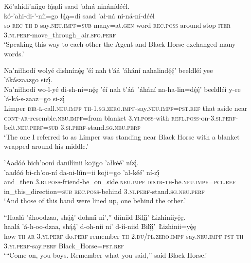 \ea\label{ex:text1-35}
Kó’ahidi’níigo łą́ądi saad ’ałná ninánídéél.\\
\gll kó-’ahi-di-’-níi=go	łą́ą=di	saad	’ał-ná	ni-ná-ní-déél\\
     so-\textsc{rec}-\textsc{th}-\textsc{d}-say.\textsc{neu}.\textsc{impf}=\textsc{sub}	many=at.\textsc{gen}	word	\textsc{rec}.\textsc{poss}-around	stop-\textsc{iter}-3.\textsc{ni}.\textsc{perf}-move\_through\_air.\textsc{sfo}.\textsc{perf}\\
\glt `Speaking this way to each other the Agent and Black Horse exchanged many words.'
\z

\ea\label{ex:text1-36-1}
Na’niłhodí wolyé dishnínę́ę ’éí nah t’áá ’áhání nahalindę́ę́’ beeldléí yee ’ákászaazgo sizį́.\\
\gll Na’niłhodí	wo-l-yé	di-sh-ní=nę́ę	’éí	nah	t’áá~{’áhání}	na-ha-lin=dę́ę́’	beeldléí	y-ee	’á-ká-s-zaaz=go	si-zį́\\
     Limper	\textsc{dir}-\textsc{l}-call.\textsc{neu}.\textsc{impf}	\textsc{th}-1.\textsc{sg}.\textsc{zero}.\textsc{impf}-say.\textsc{neu}.\textsc{impf}=\textsc{pst}.\textsc{ref}	that	aside	near	\textsc{cont}-\textsc{ar}-resemble.\textsc{neu}.\textsc{impf}=from	blanket	3.\textsc{yi}.\textsc{poss}-with	\textsc{refl}.\textsc{poss}-on-3.\textsc{si}.\textsc{perf}-belt.\textsc{neu}.\textsc{perf}=\textsc{sub}	3.\textsc{si}.\textsc{perf}-stand.\textsc{sg}.\textsc{neu}.\textsc{perf}\\
\glt `The one I referred to as Limper was standing near Black Horse with a blanket wrapped around his middle.'
\z

\ea\label{ex:text1-36-2}
’Aadóó bich’ooní danilíinii kojigo ’ałkéé’ nízį́.\\
\gll ’aadóó	bi-ch’oo-ní	da-ni-líin=ii	koji=go	’ał-kéé’	ní-zį́\\
     and\_then	3.\textsc{bi}.\textsc{poss}-friend-be\_on\_side.\textsc{neu}.\textsc{impf}	\textsc{distr}-\textsc{th}-be.\textsc{neu}.\textsc{impf}=\textsc{pcl}.\textsc{ref}	in\_this\_direction=\textsc{sub}	\textsc{rec}.\textsc{poss}-behind	3.\textsc{ni}.\textsc{perf}-stand.\textsc{sg}.\textsc{neu}.\textsc{perf}\\
\glt `And those of this band were lined up, one behind the other.'
\z

\ea\label{ex:text1-37}
``Haalá ’áhoodzaa, shą́ą́’ dohníi ni’,'' dííniid Bilį́į́’ Łizhiniiyę́ę.\\
\gll haalá	’á-h-oo-dzaa, shą́ą́’	d-oh-níi	ni’	d-íí-niid	Bilį́į́’~{Łizhinii=yę́ę}\\
     how	\textsc{th}-\textsc{ar}-3.\textsc{yi}.\textsc{perf}-do.\textsc{perf} remember	\textsc{th}-2.\textsc{du}/\textsc{pl}.\textsc{zero}.\textsc{impf}-say.\textsc{neu}.\textsc{impf}	\textsc{pst}	\textsc{th}-3.\textsc{yi}.\textsc{perf}-say.\textsc{perf}	Black\_Horse=\textsc{pst}.\textsc{ref}\\
\glt `{``}Come on, you boys. Remember what you said,'' said Black Horse.'
\z

